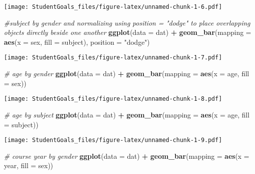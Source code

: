\documentclass[]{article}
\newenvironment{Shaded}{\begin{snugshade}}{\end{snugshade}}
\newcommand{\CommentTok}[1]{\textcolor[rgb]{0.56,0.35,0.01}{\textit{#1}}}
\newcommand{\DataTypeTok}[1]{\textcolor[rgb]{0.13,0.29,0.53}{#1}}
\newcommand{\KeywordTok}[1]{\textcolor[rgb]{0.13,0.29,0.53}{\textbf{#1}}}
\newcommand{\NormalTok}[1]{#1}
\newcommand{\OperatorTok}[1]{\textcolor[rgb]{0.81,0.36,0.00}{\textbf{#1}}}
\newcommand{\StringTok}[1]{\textcolor[rgb]{0.31,0.60,0.02}{#1}}
\begin{document}
\texttt{[image: StudentGoals\_files/figure-latex/unnamed-chunk-1-6.pdf]}

\begin{Shaded}
\begin{Highlighting}[]
\CommentTok{#subject by gender and normalizing using position = "dodge" to place overlapping objects directly beside one another}
\KeywordTok{ggplot}\NormalTok{(}\DataTypeTok{data =}\NormalTok{ dat) }\OperatorTok{+}\StringTok{ }
\StringTok{  }\KeywordTok{geom_bar}\NormalTok{(}\DataTypeTok{mapping =} \KeywordTok{aes}\NormalTok{(}\DataTypeTok{x =}\NormalTok{ sex, }\DataTypeTok{fill =}\NormalTok{ subject), }\DataTypeTok{position =} \StringTok{"dodge"}\NormalTok{)}
\end{Highlighting}
\end{Shaded}

\texttt{[image: StudentGoals\_files/figure-latex/unnamed-chunk-1-7.pdf]}

\begin{Shaded}
\begin{Highlighting}[]
\CommentTok{# age by gender}
\KeywordTok{ggplot}\NormalTok{(}\DataTypeTok{data =}\NormalTok{ dat) }\OperatorTok{+}\StringTok{ }
\StringTok{  }\KeywordTok{geom_bar}\NormalTok{(}\DataTypeTok{mapping =} \KeywordTok{aes}\NormalTok{(}\DataTypeTok{x =}\NormalTok{ age, }\DataTypeTok{fill =}\NormalTok{ sex))}
\end{Highlighting}
\end{Shaded}

\texttt{[image: StudentGoals\_files/figure-latex/unnamed-chunk-1-8.pdf]}

\begin{Shaded}
\begin{Highlighting}[]
\CommentTok{# age by subject}
\KeywordTok{ggplot}\NormalTok{(}\DataTypeTok{data =}\NormalTok{ dat) }\OperatorTok{+}\StringTok{ }
\StringTok{  }\KeywordTok{geom_bar}\NormalTok{(}\DataTypeTok{mapping =} \KeywordTok{aes}\NormalTok{(}\DataTypeTok{x =}\NormalTok{ age, }\DataTypeTok{fill =}\NormalTok{ subject))}
\end{Highlighting}
\end{Shaded}

\texttt{[image: StudentGoals\_files/figure-latex/unnamed-chunk-1-9.pdf]}

\begin{Shaded}
\begin{Highlighting}[]
\CommentTok{# course year by gender}
\KeywordTok{ggplot}\NormalTok{(}\DataTypeTok{data =}\NormalTok{ dat) }\OperatorTok{+}\StringTok{ }
\StringTok{  }\KeywordTok{geom_bar}\NormalTok{(}\DataTypeTok{mapping =} \KeywordTok{aes}\NormalTok{(}\DataTypeTok{x =}\NormalTok{ year, }\DataTypeTok{fill =}\NormalTok{ sex))}
\end{Highlighting}
\end{Shaded}
\end{document}
